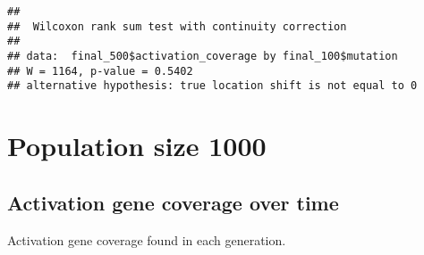\documentclass[
]{book}
\newenvironment{Shaded}{\begin{snugshade}}{\end{snugshade}}
\newcommand{\AttributeTok}[1]{\textcolor[rgb]{0.13,0.29,0.53}{#1}}
\newcommand{\ConstantTok}[1]{\textcolor[rgb]{0.56,0.35,0.01}{#1}}
\newcommand{\DecValTok}[1]{\textcolor[rgb]{0.00,0.00,0.81}{#1}}
\newcommand{\FloatTok}[1]{\textcolor[rgb]{0.00,0.00,0.81}{#1}}
\newcommand{\FunctionTok}[1]{\textcolor[rgb]{0.13,0.29,0.53}{\textbf{#1}}}
\newcommand{\NormalTok}[1]{#1}
\newcommand{\OtherTok}[1]{\textcolor[rgb]{0.56,0.35,0.01}{#1}}
\newcommand{\SpecialCharTok}[1]{\textcolor[rgb]{0.81,0.36,0.00}{\textbf{#1}}}
\newcommand{\StringTok}[1]{\textcolor[rgb]{0.31,0.60,0.02}{#1}}
\begin{document}
\begin{Shaded}
\end{Shaded}

\begin{verbatim}
## 
##  Wilcoxon rank sum test with continuity correction
## 
## data:  final_500$activation_coverage by final_100$mutation
## W = 1164, p-value = 0.5402
## alternative hypothesis: true location shift is not equal to 0
\end{verbatim}

\hypertarget{population-size-1000}{%
\section{Population size 1000}\label{population-size-1000}}

\hypertarget{activation-gene-coverage-over-time-2}{%
\subsection{Activation gene coverage over time}\label{activation-gene-coverage-over-time-2}}

Activation gene coverage found in each generation.
\end{document}
